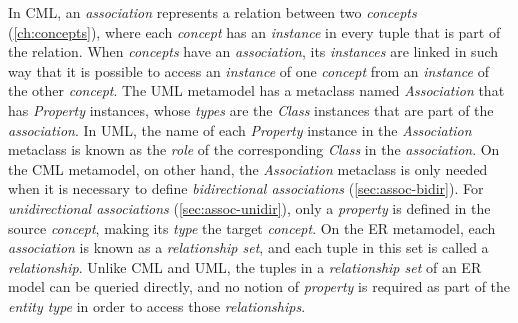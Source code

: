 \begin{definition}
In CML,
an \emph{association} represents a relation between two \emph{concepts} (\ref{ch:concepts}),
where each \emph{concept} has an \emph{instance} in every tuple that is part of the relation.
When \emph{concepts} have an \emph{association},
its \emph{instances} are linked in such way that
it is possible to access an \emph{instance} of one \emph{concept}
from an \emph{instance} of the other \emph{concept}.
The UML \cite{uml} metamodel has a metaclass named \emph{Association} that has \emph{Property} instances,
whose \emph{types} are the \emph{Class} instances that are part of the \emph{association}.
In UML, the name of each \emph{Property} instance in the \emph{Association} metaclass
is known as the \emph{role} of the corresponding \emph{Class} in the \emph{association}.
On the CML metamodel, on other hand,
the \emph{Association} metaclass is only needed
when it is necessary to define \emph{bidirectional associations} (\ref{sec:assoc-bidir}).
For \emph{unidirectional associations} (\ref{sec:assoc-unidir}),
only a \emph{property} is defined in the source \emph{concept},
making its \emph{type} the target \emph{concept}.
On the ER \cite{er} metamodel,
each \emph{association} is known as a \emph{relationship set},
and each tuple in this set is called a \emph{relationship}.
Unlike CML and UML,
the tuples in a \emph{relationship set} of an ER model
can be queried directly,
and no notion of \emph{property} is required as part of the \emph{entity type}
in order to access those \emph{relationships}.
\end{definition}
